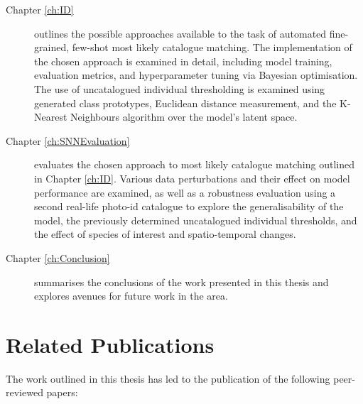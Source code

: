 \begin{description}
	\item[Chapter \ref{ch:ID}] outlines the possible approaches available to the task of automated fine-grained, few-shot most likely catalogue matching. The implementation of the chosen approach is examined in detail, including model training, evaluation metrics, and hyperparameter tuning via Bayesian optimisation. The use of uncatalogued individual thresholding is examined using generated class prototypes, Euclidean distance measurement, and the K-Nearest Neighbours algorithm over the model's latent space. 
	
	\item[Chapter \ref{ch:SNNEvaluation}] evaluates the chosen approach to most likely catalogue matching outlined in Chapter \ref{ch:ID}. Various data perturbations and their effect on model performance are examined, as well as a robustness evaluation using a second real-life photo-id catalogue to explore the generalisability of the model, the previously determined uncatalogued individual thresholds, and the effect of species of interest and spatio-temporal changes.
	
	\item[Chapter \ref{ch:Conclusion}] summarises the conclusions of the work presented in this thesis and explores avenues for future work in the area.  
	 
\end{description}

\section{Related Publications}\label{ch:intro,relatedPublications}

The work outlined in this thesis has led to the publication of the following peer-reviewed papers:


